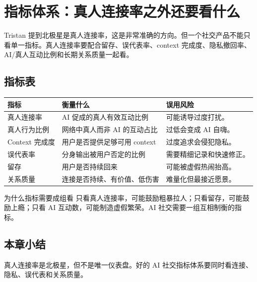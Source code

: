 \section{指标体系：真人连接率之外还要看什么}

Tristan 提到北极星是真人连接率，这是非常准确的方向。但一个社交产品不能只看单一指标。真人连接率要配合留存、误代表率、context 完成度、隐私撤回率、AI/真人互动比例和长期关系质量一起看。

\subsection{指标表}

\noindent\begin{longtable}{p{}p{}p{}}
\toprule
指标 & 衡量什么 & 误用风险 \\
\midrule
真人连接率 & AI 促成的真人有效互动比例 & 可能诱导过度打扰。 \\
真人行为比例 & 网络中真人而非 AI 的互动占比 & 过低会变成 AI 自嗨。 \\
Context 完成度 & 用户是否提供足够可用 context & 过度追求会侵犯隐私。 \\
误代表率 & 分身输出被用户否定的比例 & 需要精细记录和快速修正。 \\
留存 & 用户是否持续回来 & 可能被虚假热闹抬高。 \\
关系质量 & 连接是否持续、有价值、低伤害 & 难量化但最接近愿景。 \\
\bottomrule
\end{longtable}

\begin{knowledgebox}{为什么指标需要成组看}
只看真人连接率，可能鼓励粗暴拉人；只看留存，可能鼓励上瘾；只看 AI 互动数，可能制造虚假繁荣。AI 社交需要一组互相制衡的指标。
\end{knowledgebox}

\subsection{本章小结}

真人连接率是北极星，但不是唯一仪表盘。好的 AI 社交指标体系要同时看连接、隐私、误代表和关系质量。

